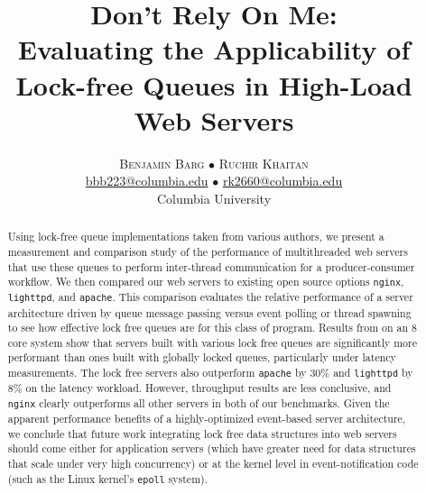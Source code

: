 \documentclass[twoside,10pt]{article}
\title{\vspace{-15mm}%
  \fontsize{24pt}{10pt}\selectfont \textbf{Don't Rely On Me:}\\
  \textbf{Evaluating the Applicability of Lock-free Queues in High-Load Web
    Servers} }
\author{%
  \large
  \textsc{Benjamin Barg $\bullet$ Ruchir Khaitan}\\[2mm]
  \normalsize \href{mailto:bbb2123@columbia.edu}{bbb223@columbia.edu}
    $\bullet$ \href{mailto:rk2660@columbia.edu}{rk2660@columbia.edu}\\
  \normalsize	Columbia University
  \vspace{-5mm} }
\date{}
\begin{document}
\maketitle
\thispagestyle{fancy}

\begin{abstract}
  \noindent Using lock-free queue implementations taken from various
  authors, we present a measurement and comparison study of the
  performance of multithreaded web servers that use these queues to
  perform inter-thread communication for a producer-consumer
  workflow. We then compared our web servers to existing open source
  options \verb+nginx+, \verb+lighttpd+, and \verb+apache+. This
  comparison evaluates the relative performance of a server
  architecture driven by queue message passing versus event polling or
  thread spawning to see how effective lock free queues are for this
  class of program. Results from on an 8 core system show that servers
  built with various lock free queues are significantly more
  performant than ones built with globally locked queues, particularly
  under latency measurements. The lock free servers also outperform
  \verb+apache+ by 30\% and \verb+lighttpd+ by 8\% on the latency
  workload. However, throughput results are less conclusive, and
  \verb+nginx+ clearly outperforms all other servers in both of our
  benchmarks. Given the apparent performance benefits of a
  highly-optimized event-based server architecture, we conclude that
  future work integrating lock free data structures into web servers
  should come either for application servers (which have greater need
  for data structures that scale under very high concurrency) or at
  the kernel level in event-notification code (such as the Linux
  kernel's \verb+epoll+ system).
\end{abstract}
\end{document}
